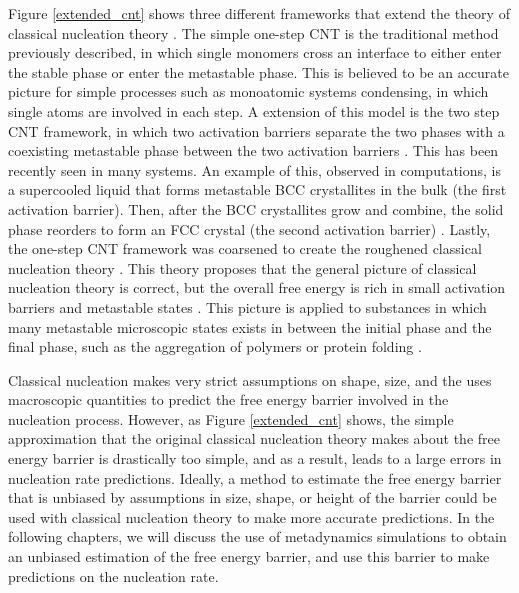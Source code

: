 Figure \ref{extended_cnt} shows three different frameworks that extend the theory of classical nucleation theory \cite{DeYoreo2016}.  The simple one-step CNT is the traditional method previously described, in which single monomers cross an interface to either enter the stable phase or enter the metastable phase.  This is believed to be an accurate picture for simple processes such as monoatomic systems condensing, in which single atoms are involved in each step.  A extension of this model is the two step CNT framework, in which two activation barriers separate the two phases with a coexisting metastable phase between the two activation barriers \cite{DeYoreo2016}.  This has been recently seen in many systems.  An example of this, observed in computations, is a supercooled liquid that forms metastable BCC crystallites in the bulk (the first activation barrier).  Then, after the BCC crystallites grow and combine, the solid phase reorders to form an FCC crystal (the second activation barrier) \cite{Braig2011}.  Lastly, the one-step CNT framework was coarsened to create the roughened classical nucleation theory \cite{DeYoreo2016}.  This theory proposes that the general picture of classical nucleation theory is correct, but the overall free energy is rich in small activation barriers and metastable states \cite{DeYoreo2016}.  This picture is applied to substances in which many metastable microscopic states exists in between the initial phase and the final phase, such as the aggregation of polymers or protein folding \cite{DeYoreo2016}\cite{Vekilov2016}.  

Classical nucleation makes very strict assumptions on shape, size, and the uses macroscopic quantities to predict the free energy barrier involved in the nucleation process.  However, as Figure \ref{extended_cnt} shows, the simple approximation that the original classical nucleation theory makes about the free energy barrier is drastically too simple, and as a result, leads to a large errors in nucleation rate predictions.  Ideally, a method to estimate the free energy barrier that is unbiased by assumptions in size, shape, or height of the barrier could be used with classical nucleation theory to make more accurate predictions.  In the following chapters, we will discuss the use of metadynamics simulations to obtain an unbiased estimation of the free energy barrier, and use this barrier to make predictions on the nucleation rate.

